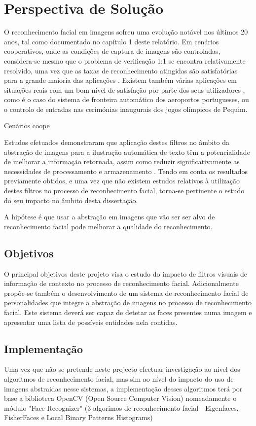 \chapter{Perspectiva de Solução} \label{chap:solução}

O reconhecimento facial em imagens sofreu uma evolução notável nos últimos 20 anos, tal como documentado no capítulo 1 deste relatório. Em cenários cooperativos, onde as condições de captura de imagens são controladas, considera-se mesmo que o problema de verificação 1:1 se encontra relativamente resolvido, uma vez que as taxas de reconhecimento atingidas são satisfatórias para a grande maioria das aplicações \citep{Li2011}. Existem também várias aplicações em situações reais com um bom nível de satisfação por parte dos seus utilizadores , como é o caso do sistema de fronteira automático dos aeroportos portugueses, ou o controlo de entradas nas cerimónias inaugurais dos jogos olímpicos de Pequim.

Cenários coope

Estudos efetuados demonstraram que aplicação destes filtros no âmbito da abstração de imagens para a ilustração automática de texto têm a potencialidade de melhorar a informação retornada, assim como reduzir significativamente as necessidades de processamento e armazenamento \citep{Coelho2012}. Tendo em conta os resultados previamente obtidos, e uma vez que não existem estudos relativos à utilização destes filtros no processo de reconhecimento facial, torna-se pertinente o estudo do seu impacto no âmbito desta dissertação.


A hipótese é que usar a abstração em imagens que vão ser ser alvo de reconhecimento facial pode melhorar a qualidade do reconhecimento.

\section{Objetivos} \label{sec:goals}
O principal objetivos deste projeto visa o estudo do impacto de filtros visuais de informação de contexto no processo de reconhecimento facial.
Adicionalmente propõe-se também o desenvolvimento de um sistema de reconhecimento facial de personalidades que integre a abstração de imagens no processo de reconhecimento facial. Este sistema deverá ser capaz de detetar as faces presentes numa imagem e apresentar uma lista de possíveis entidades nela contidas.

\section{Implementação} \label{sec:implementacao}
Uma vez que não se pretende neste projecto efectuar investigação ao nível dos algoritmos de reconhecimento facial, mas sim ao nível do impacto do uso de imagens abstraidas nesse sistemas, a implementação desses algoritmos terá por base a biblioteca OpenCV (Open Source Computer Vision) nomeadamente o módulo "Face Recognizer" (3 algorimos de reconhecimento facial - Eigenfaces, FisherFaces e Local Binary Patterns Histograms)


